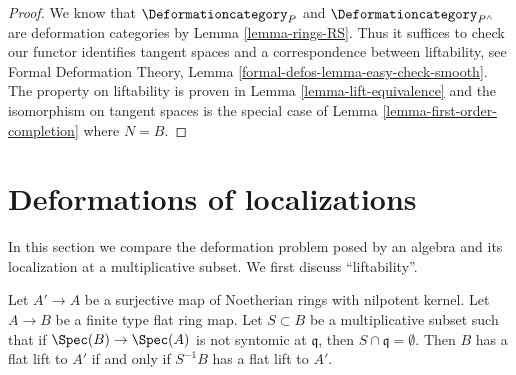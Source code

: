 \begin{proof}
We know that $\Deformationcategory_P$ and $\Deformationcategory_{P^\wedge}$
are deformation categories by Lemma \ref{lemma-rings-RS}.
Thus it suffices to check
our functor identifies tangent spaces and a correspondence
between liftability, see
Formal Deformation Theory, Lemma \ref{formal-defos-lemma-easy-check-smooth}.
The property on liftability is proven in
Lemma \ref{lemma-lift-equivalence}
and the isomorphism on tangent spaces is the special case of
Lemma \ref{lemma-first-order-completion} where $N = B$.
\end{proof}



\section{Deformations of localizations}
\label{section-compare-localization}

\noindent
In this section we compare the deformation problem posed
by an algebra and its localization at a multiplicative subset.
We first discuss ``liftability''.

\begin{lemma}
\label{lemma-lift-equivalence-localization}
Let $A' \to A$ be a surjective map of Noetherian rings with nilpotent kernel.
Let $A \to B$ be a finite type flat ring map.
Let $S \subset B$ be a multiplicative subset such that
if $\Spec(B) \to \Spec(A)$ is not syntomic at $\mathfrak q$,
then $S \cap \mathfrak q = \emptyset$.
Then $B$ has a flat lift to $A'$ if and only if
$S^{-1}B$ has a flat lift to $A'$.
\end{lemma}

